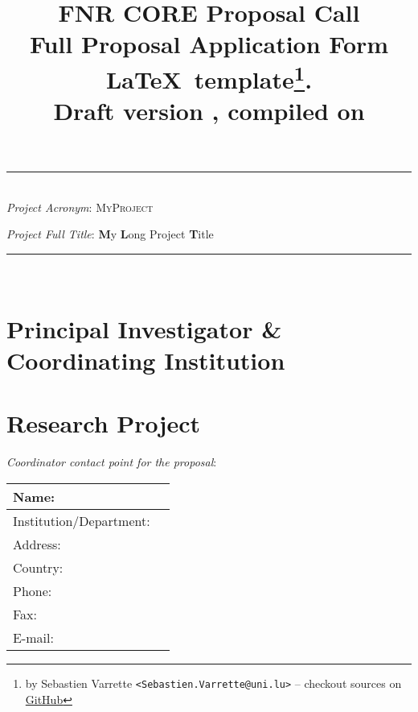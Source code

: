 \documentclass[11pt,twoside,a4paper]{article}
\title{\textbf{\Large FNR CORE Proposal Call} \\[1em]
  {\small Full Proposal Application Form \LaTeX\ template\thanks{by Sebastien
      Varrette {\small \texttt{<Sebastien.Varrette@uni.lu>}} -- checkout sources
      on \href{https://github.com/Falkor/fnr-latex-template}{GitHub}}.\\
    \textbf{Draft version \docversion}, compiled on \isodayandtime}
}
\author{}
\date{}
\newcommand{\project}{\textsc{MyProject}\xspace}
\newcommand{\fulltitle}{\textbf{M}y \textbf{L}ong \textsc{P}roject \textbf{T}itle\xspace}
\begin{document}
\maketitle
{\Large
  \begin{center}
      \hrule
      ~\\
      \emph{Project Acronym}: \project

      \emph{Project Full Title}: \fulltitle\\[1em]
  \end{center}
}
\hrule
~\\[1em]

\tableofcontents
\clearpage

\section{Principal Investigator \& Coordinating Institution}


\section{Research Project}

  
 

  

\clearpage


  
\emph{Coordinator contact point for the proposal}:

\begin{table}[H]
    \centering\small
    \begin{tabular}{|p{}|p{}|}
        \hline
        Name:                   & \\\hline
        Institution/Department: & \\\hline
        Address:                & \\\hline
        Country:                & \\\hline
        Phone:                  & \\\hline
        Fax:                    & \\\hline
        E-mail:                 & \\\hline
        \hline
    \end{tabular}
\end{table}
\end{document}
